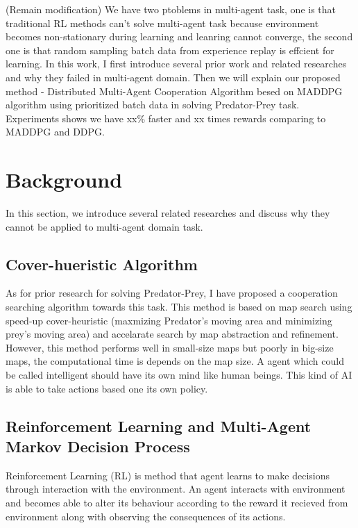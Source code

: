 \documentclass[11pt,twocolumn]{jarticle} %
\begin{document}
(Remain modification)
We have two ptoblems in multi-agent task, one is that traditional RL methods can't solve multi-agent task because environment becomes non-stationary during learning and leanring cannot converge, the second one is that random sampling batch data from experience replay is effcient for learning. In this work, I first introduce several prior work and related researches and why they failed in multi-agent domain. Then we will explain our proposed method - Distributed Multi-Agent Cooperation Algorithm besed on MADDPG algorithm\cite{maddpg} using prioritized batch data in solving Predator-Prey task. Experiments shows we have xx\% faster and xx times rewards comparing to MADDPG and DDPG.\par

\section{Background} 
In this section, we introduce several related researches and discuss why they cannot be applied to multi-agent domain task.
\subsection{Cover-hueristic Algorithm\cite{cover}}
As for prior research for solving Predator-Prey, I have proposed a cooperation searching algorithm towards this task. This method is based on map search using speed-up cover-heuristic \cite{cover-heuristic} (maxmizing Predator's moving area and minimizing prey's moving area) and accelarate search by map abstraction and refinement. However, this method performs well in small-size maps but poorly in big-size maps, the computational time is depends on the map size. A agent which could be called intelligent should have its own mind like human beings. This kind of AI is able to take actions based one its own policy.\par


\subsection{Reinforcement Learning and Multi-Agent Markov Decision Process}

Reinforcement Learning (RL) is method that agent learns to make decisions through interaction with the environment. An agent interacts with environment and becomes able to alter its behaviour according to the reward it recieved from environment along with observing the consequences of its actions. \par
\end{document}
